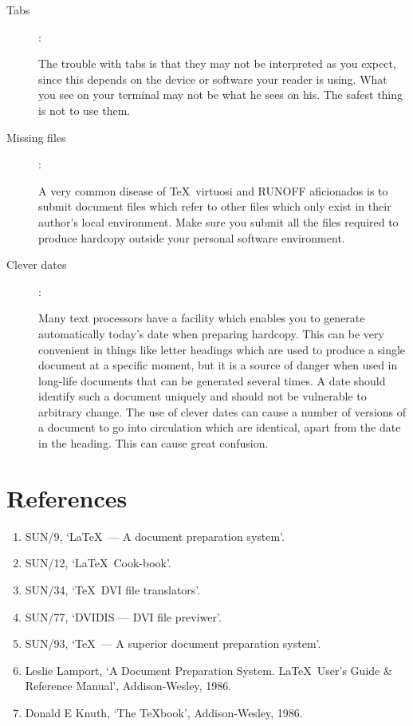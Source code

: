 \begin{description}
\item [Tabs] :

The trouble with tabs is that they may not be interpreted as you expect, since
this depends on the device or software your reader is using.
What you see on your terminal may not be what he sees on his.
The safest thing is not to use them.

\item [Missing files]:

A very common disease of \TeX\ virtuosi and RUNOFF aficionados is to submit
document files which refer to other files which only exist in their author's
local environment.
Make sure you submit all the files required to produce hardcopy outside
your personal software environment.

\item [Clever dates]:

Many text processors have a facility which enables you to generate automatically
today's date when preparing hardcopy.
This can be very convenient in things like letter headings which are used
to produce a single document at a specific moment, but it is a source of
danger when used in long-life documents that can be generated several
times.
A date should identify such a document uniquely and should not be vulnerable to
arbitrary change.
The use of clever dates can cause a number of versions of a document to go
into circulation which are identical, apart from the date in the heading.
This can cause great confusion.

\end{description}

\section{References}

\begin{enumerate}
\item SUN/9, `\LaTeX\ --- A document preparation system'.
\item SUN/12, `\LaTeX\ Cook-book'.
\item SUN/34, `\TeX\ DVI file translators'.
\item SUN/77, `DVIDIS --- DVI file previwer'.
\item SUN/93, `\TeX\ --- A superior document preparation system'.
\item Leslie Lamport, `A Document Preparation System. \LaTeX\ User's Guide \&
 Reference Manual', Addison-Wesley, 1986.
\item Donald E Knuth, `The \TeX book', Addison-Wesley, 1986.
\end{enumerate}


